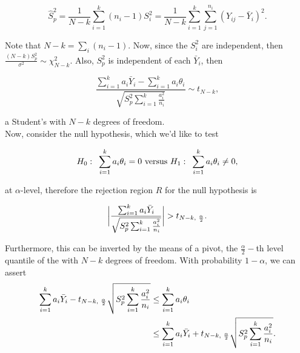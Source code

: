 \documentclass{homework}
\begin{document}
$$
\hat{S}^2_p = \frac{1}{N-k} \sum_{i=1}^{k} (n_i-1)S_i^2 = \frac{1}{N-k} \sum_{i=1}^{k} \sum_{j=1}^{n_i} (Y_{ij}-\bar{Y}_i)^2.
$$

Note that $N-k =\sum_{i} (n_i - 1)$. Now, since the $S_i^2$ are independent, then $\frac{(N-k)S^2_p}{\sigma^2} \sim \chi^2_{N-k}$. Also, $S_p^2$ is independent of each $\bar{Y}_i$, then

$$
\frac{\sum_{i=1}^k a_i \bar{Y}_i - \sum_{i=1}^k a_i \theta_i}{\sqrt{S_p^2 \sum_{i=1}^{k} \frac{a_i^2}{n_i}}} \sim t_{N-k},
$$

a Student's \tdis with $N-k$ degrees of freedom. \\

Now, consider the null hypothesis, which we'd like to test

$$
H_0 : \textnormal{ } \sum_{i=1}^{k} a_i \theta_i = 0 \textnormal{ versus } H_1 : \textnormal{ } \sum_{i=1}^{k} a_i \theta_i \neq 0,
$$

at $\alpha$-level, therefore the rejection region $R$ for the null hypothesis is 

$$
\bigg|\frac{\sum_{i=1}^{k} a_i \bar{Y}_i}{{\sqrt{S_p^2 \sum_{i=1}^{k} \frac{a_i^2}{n_i}}}}\bigg| > t_{N-k, \textnormal{ } \frac{\alpha}{2}}.
$$

Furthermore, this can be inverted by the means of a pivot, the $\frac{\alpha}{2}-$th level quantile of the \tdis with $N-k$ degrees of freedom. With probability $1-\alpha$, we can assert 
\begin{align*}
    \sum_{i=1}^{k} a_i \bar{Y}_i - t_{N-k, \textnormal{ } \frac{\alpha}{2}} \sqrt{S_p^2 \sum_{i=1}^{k} \frac{a_i^2}{n_i}} &\leq \sum_{i=1}^{k} a_i \theta_i \\
    &\leq \sum_{i=1}^{k} a_i \bar{Y}_i + t_{N-k, \textnormal{ } \frac{\alpha}{2}} \sqrt{S_p^2 \sum_{i=1}^{k} \frac{a_i^2}{n_i}}.
\end{align*}
\end{document}
